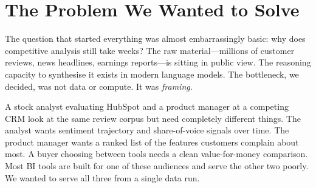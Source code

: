 \documentclass[9pt, a4paper, twocolumn]{article}
\begin{document}

\section{The Problem We Wanted to Solve}

The question that started everything was almost embarrassingly basic: why does competitive analysis still take weeks? The raw material---millions of customer reviews, news headlines, earnings reports---is sitting in public view. The reasoning capacity to synthesise it exists in modern language models. The bottleneck, we decided, was not data or compute. It was \textit{framing}.

A stock analyst evaluating HubSpot and a product manager at a competing CRM look at the same review corpus but need completely different things. The analyst wants sentiment trajectory and share-of-voice signals over time. The product manager wants a ranked list of the features customers complain about most. A buyer choosing between tools needs a clean value-for-money comparison. Most BI tools are built for one of these audiences and serve the other two poorly. We wanted to serve all three from a single data run.
\end{document}
